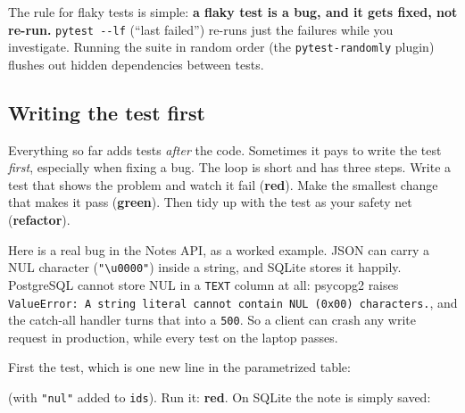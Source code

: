The rule for flaky tests is simple: \textbf{a flaky test is a bug, and it gets fixed, not re-run.} \texttt{pytest\ -\/-lf} (``last failed'') re-runs just the failures while you investigate. Running the suite in random order (the \texttt{pytest-randomly} plugin) flushes out hidden dependencies between tests.

\subsection*{Writing the test first}\label{17-build-process:writing-the-test-first}

Everything so far adds tests \emph{after} the code. Sometimes it pays to write the test \emph{first}, especially when fixing a bug. The loop is short and has three steps. Write a test that shows the problem and watch it fail (\textbf{red}). Make the smallest change that makes it pass (\textbf{green}). Then tidy up with the test as your safety net (\textbf{refactor}).

Here is a real bug in the Notes API, as a worked example. JSON can carry a NUL character (\texttt{"\textbackslash{}u0000"}) inside a string, and SQLite stores it happily. PostgreSQL cannot store NUL in a \texttt{TEXT} column at all: psycopg2 raises \texttt{ValueError:}\allowbreak{}\texttt{\ A\ string\ literal\ cannot\ contain\ NUL\ (0x00)\ characters.}, and the catch-all handler turns that into a \texttt{500}. So a client can crash any write request in production, while every test on the laptop passes.

First the test, which is one new line in the parametrized table:

\begin{codebox}[short]

\begin{Shaded}
\begin{Highlighting}[]
\NormalTok{        (\{}\NormalTok{: }\NormalTok{\}, }\NormalTok{),}
\end{Highlighting}
\end{Shaded}

\end{codebox}

\noindent{}(with \texttt{"nul"} added to \texttt{ids}). Run it: \textbf{red}. On SQLite the note is simply saved:

